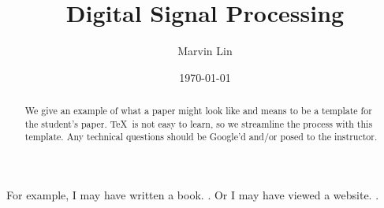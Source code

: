 \documentclass[11pt]{article}
\title{Digital Signal Processing}
\author{Marvin Lin}
\date{\today}
\affil{Portland Community College}
\begin{document}

\maketitle


\begin{abstract}

We give an example of what a paper might look like and means to be a template for the student's paper. \TeX\ is not easy to learn, so we streamline the process with this template. Any technical questions should be Google'd and/or posed to the instructor.

\end{abstract}


For example, I may have written a book. \cite{book:author}. Or I may have viewed a website. \cite{website:topic}.



\end{document}
